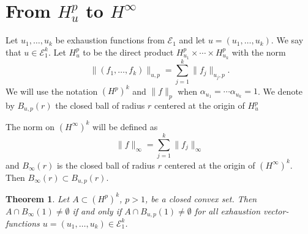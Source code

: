 \documentclass{amsart}
\newtheorem{Theorem}{Theorem}[section]
\theoremstyle{remark}
\begin{document}
\section{From $H^p_u$ to $H^\infty$}\label{S:hp}
\par Let $u_1,\dots,u_k$ be exhaustion functions from ${{\mathcal E}}_1$ and let $u=(u_1,\dots,u_k)$. We say that $u\in{{\mathcal E}}^k_1$. Let $H^p_u$ to be the direct product $H^p_{u_1}\times\cdots\times H^p_{u_k}$ with the norm
\[\|(f_1,\dots,f_k)\|_{u,p}=\sum_{j=1}^k\|f_j\|_{u_j,p}.\] We will use the notation $(H^p)^k$ and $\|f\|_p$ when ${\alpha}_{u_1}=\cdots{\alpha}_{u_k}=1$. We denote by $B_{u,p}(r)$ the closed ball of radius $r$ centered at the origin of $H^p_u$
\par  The norm on $(H^\infty)^k$ will be defined as
\[\|f\|_{\infty}=\sum_{j=1}^k\|f_j\|_\infty\] and $B_\infty(r)$ is the closed ball of radius $r$ centered at the origin of $(H^\infty)^k$. Then $B_\infty(r){\subset} B_{u,p}(r)$.
\begin{Theorem} \label{T:int1}Let $A {\subset} (H^p)^k$, $p>1$, be a closed convex set. Then $A\cap B_\infty(1) \neq \emptyset$ if and only if $A\cap B_{u,p}(1) \neq \emptyset$ for all exhaustion vector-functions $u=(u_1,\dots,u_k)\in{{\mathcal E}}^k_1$. \end{Theorem}
\end{document}
